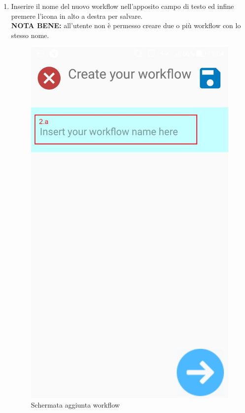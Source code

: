 \begin{enumerate}
\newpage
\item Inserire il nome del nuovo workflow nell'apposito campo di testo ed infine premere l'icona in alto a destra per salvare.\\
\textbf{NOTA BENE:} all'utente non è permesso creare due o più workflow con lo stesso nome.

\begin{figure}[!ht]
	\centering
	\includegraphics[scale=0.2]{images/AddWorkflow.jpg}
	\caption{Schermata aggiunta workflow}
\end{figure}


\end{enumerate}
